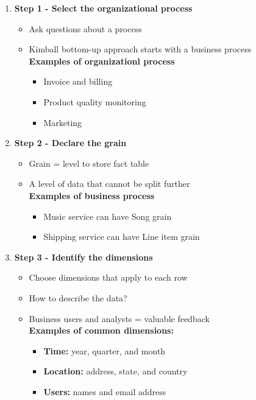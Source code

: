 \begin{enumerate}
    \item \textbf{Step 1 - Select the organizational process}
    \begin{itemize}
        \item Ask questions about a process
        \item Kimball bottom-up approach starts with a business process \\
        \textbf{Examples of organizationl process}
        \begin{itemize}
            \item Invoice and billing
            \item Product quality monitoring
            \item Marketing
        \end{itemize}
    \end{itemize}
    \item \textbf{Step 2 - Declare the grain}
    \begin{itemize}
        \item Grain = level to store fact table
        \item A level of data that cannot be split further \\
        \textbf{Examples of business process}
        \begin{itemize}
            \item Music service can have Song grain
            \item Shipping service can have Line item grain
        \end{itemize}
    \end{itemize}
    \item \textbf{Step 3 - Identify the dimensions}
    \begin{itemize}
        \item Choose dimensions that apply to each row 
        \item How to describe the data? 
        \item Business users and analysts = valuable feedback \\
        \textbf{Examples of common dimensions:}
        \begin{itemize}
            \item \textbf{Time:} year, quarter, and month
            \item \textbf{Location:} address, state, and country
            \item \textbf{Users:} names and email address

\end{itemize}
\end{itemize}
\end{enumerate}
